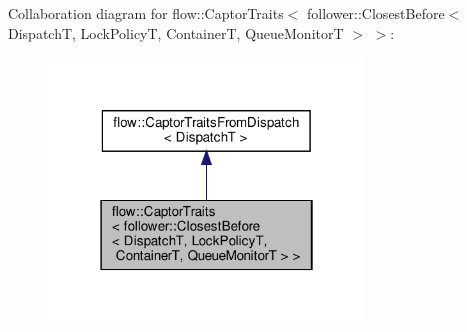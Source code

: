 Collaboration diagram for flow\+:\+:Captor\+Traits$<$ follower\+:\+:Closest\+Before$<$ DispatchT, Lock\+PolicyT, ContainerT, Queue\+MonitorT $>$ $>$\+:
\nopagebreak
\begin{figure}[H]
\begin{center}
\leavevmode
\includegraphics[width=238pt]{structflow_1_1_captor_traits_3_01follower_1_1_closest_before_3_01_dispatch_t_00_01_lock_policy_te2d2da6c11e1cd723d360f7d301ea924}
\end{center}
\end{figure}
